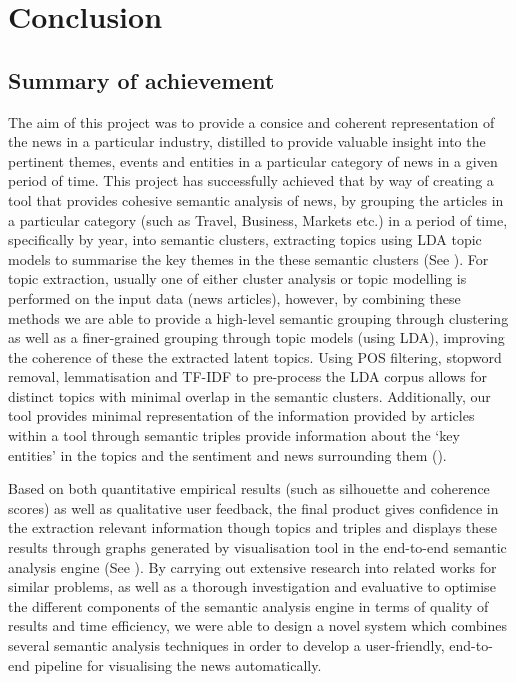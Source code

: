 \chapter{Conclusion}

\section{Summary of achievement}

The aim of this project was to provide a consice and coherent representation of the news in a particular industry, distilled to provide valuable insight into the pertinent themes, events and entities in a particular category of news in a given period of time. This project has successfully achieved that by way of creating a tool that provides cohesive semantic analysis of news, by grouping the articles in a particular category (such as Travel, Business, Markets etc.) in a period of time, specifically by year, into semantic clusters, extracting topics using LDA topic models to summarise the key themes in the these semantic clusters (See ). 
For topic extraction, usually one of either cluster analysis or topic modelling is performed on the input data (news articles), however, by combining these methods we are able to provide a high-level semantic grouping through clustering as well as a finer-grained grouping through topic models (using LDA), improving the coherence of these the extracted latent topics.
 Using POS filtering, stopword removal, lemmatisation and TF-IDF to pre-process the LDA corpus allows for distinct topics with minimal overlap in the semantic clusters. Additionally, our tool provides minimal representation of the information provided by articles within a tool through semantic triples provide information about the `key entities' in the topics and the sentiment and news surrounding them ().  

Based on both quantitative empirical results (such as silhouette and coherence scores) as well as qualitative user feedback, the final product gives confidence in the extraction relevant information though topics and triples and displays these results through graphs generated by visualisation tool in the end-to-end semantic analysis engine (See ). By carrying out extensive research into related works for similar problems, as well as a thorough investigation and evaluative to optimise the different components of the semantic analysis engine in terms of quality of results and time efficiency, we were able to design a novel system which combines several semantic analysis techniques in order to develop a user-friendly, end-to-end pipeline for visualising the news automatically.


